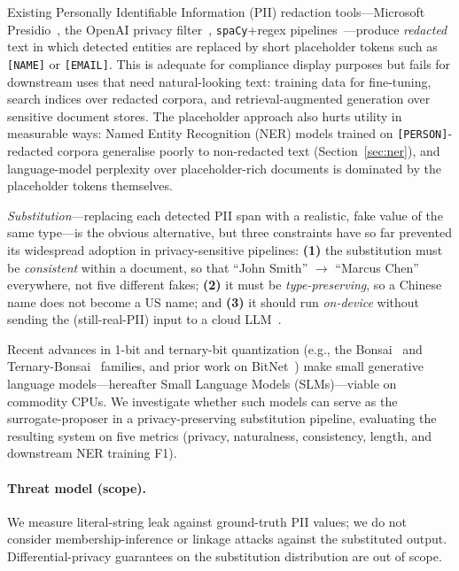 \documentclass[11pt]{article}
\newcommand{\code}[1]{\texttt{#1}}
\newcommand{\arrowto}{\ensuremath{\rightarrow}}
\newcommand{\spacy}{\code{spaCy}}
\begin{document}
Existing Personally Identifiable Information (PII) redaction
tools---Microsoft Presidio~\cite{presidio}, the OpenAI privacy
filter~\cite{privacyfilter}, \spacy{}+regex pipelines~\cite{spacy}---produce
\emph{redacted} text in which detected entities are replaced by short
placeholder tokens such as \code{[NAME]} or \code{[EMAIL]}. This is
adequate for compliance display purposes but fails for downstream uses
that need natural-looking text: training data for fine-tuning, search
indices over redacted corpora, and retrieval-augmented generation over
sensitive document stores. The placeholder approach also hurts utility
in measurable ways: Named Entity Recognition (NER) models trained on
\code{[PERSON]}-redacted corpora generalise poorly to non-redacted text
(Section~\ref{sec:ner}), and language-model perplexity over
placeholder-rich documents is dominated by the placeholder tokens
themselves.

\emph{Substitution}---replacing each detected PII span with a
realistic, fake value of the same type---is the obvious alternative,
but three constraints have so far prevented its widespread adoption in
privacy-sensitive pipelines: \textbf{(1)} the substitution must be
\emph{consistent} within a document, so that ``John Smith''
\arrowto{} ``Marcus Chen'' everywhere, not five different fakes;
\textbf{(2)} it must be \emph{type-preserving}, so a Chinese name does
not become a US name; and \textbf{(3)} it should run \emph{on-device}
without sending the (still-real-PII) input to a cloud
LLM~\cite{gpt4tr}.

Recent advances in 1-bit and ternary-bit quantization (e.g., the
Bonsai~\cite{bonsai} and Ternary-Bonsai~\cite{ternarybonsai} families,
and prior work on BitNet~\cite{bitnet}) make small generative language
models---hereafter Small Language Models (SLMs)---viable on commodity
CPUs. We investigate whether such models can serve as the
surrogate-proposer in a privacy-preserving substitution pipeline,
evaluating the resulting system on five metrics (privacy, naturalness,
consistency, length, and downstream NER training F1).

\paragraph{Threat model (scope).}
We measure literal-string leak against ground-truth PII values; we do
not consider membership-inference or linkage attacks against the
substituted output. Differential-privacy guarantees on the substitution
distribution are out of scope.
\end{document}
